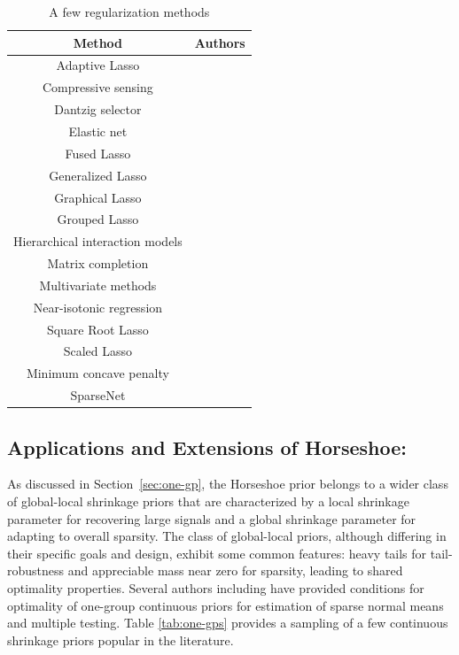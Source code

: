 \documentclass[11pt]{article}
\begin{document}
\begin{table}[ht!]
  \centering
  \caption{A few regularization methods}
  \footnotesize{
    \begin{tabular}{|c|c|}
    \hline
    Method  & Authors  \bigstrut\\
    \hline
    Adaptive Lasso & \citet{zou2006adaptive} \bigstrut[t]\\
    Compressive sensing  & \citet{donoho2006compressed,candes2008restricted} \\
    Dantzig selector  & \citet{candes2007dantzig} \\
    Elastic net & \citet{zou2005regularization} \\
    Fused Lasso & \citet{tibshirani_sparsity_2005} \\
    Generalized Lasso & \citet{tibshirani2011solution} \\
    Graphical Lasso & \citet{friedman2008sparse} \\
    Grouped Lasso & \citet{yuan2006model} \\
    Hierarchical interaction models & \citet{bien_lasso_2013} \\
    Matrix completion & \citet{candes2010power,mazumder2010spectral} \\
    Multivariate methods & \citet{jolliffe2003modified,witten2009penalized} \\
    Near-isotonic regression & \citet{tibshirani2011nearly} \\
    Square Root Lasso  & \citet{belloni2011square} \\
    Scaled Lasso & \citet{sun2012scaled} \\
    Minimum concave penalty & \citet{zhang2010nearly} \\
    SparseNet & \citet{mazumder2012} \bigstrut[b]\\
    \hline
    \end{tabular}%
    }
  \label{tab:lasso:ext}%
\end{table}%

\subsection{Applications and Extensions of Horseshoe:}

As discussed in Section~\ref{sec:one-gp}, the Horseshoe prior belongs to a wider class of global-local shrinkage priors \citep{polson2010shrink} that are characterized by a local shrinkage parameter for recovering large signals and a global shrinkage parameter for adapting to overall sparsity. The class of global-local priors, although differing in their specific goals and design, exhibit some common features: heavy tails for tail-robustness and appreciable mass near zero for sparsity, leading to shared optimality properties. Several authors including \citet{van2015conditions, ghosh2016asymptotic, ghosh2016testing} have provided conditions for optimality of one-group continuous priors for estimation of sparse normal means and multiple testing. Table \ref{tab:one-gps} provides a sampling of a few continuous shrinkage priors popular in the literature. 
\end{document}
